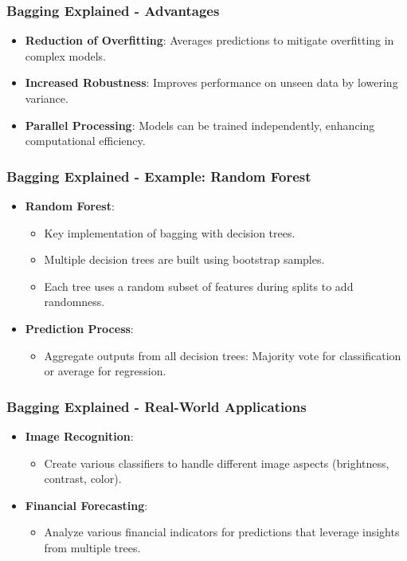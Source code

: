 \documentclass[aspectratio=169]{beamer}
\begin{document}
\begin{frame}[fragile]
    \frametitle{Bagging Explained - Advantages}
    \begin{itemize}
        \item \textbf{Reduction of Overfitting}: Averages predictions to mitigate overfitting in complex models.
        \item \textbf{Increased Robustness}: Improves performance on unseen data by lowering variance.
        \item \textbf{Parallel Processing}: Models can be trained independently, enhancing computational efficiency.
    \end{itemize}
\end{frame}

\begin{frame}[fragile]
    \frametitle{Bagging Explained - Example: Random Forest}
    \begin{itemize}
        \item \textbf{Random Forest}:
            \begin{itemize}
                \item Key implementation of bagging with decision trees.
                \item Multiple decision trees are built using bootstrap samples.
                \item Each tree uses a random subset of features during splits to add randomness.
            \end{itemize}
        
        \item \textbf{Prediction Process}:
            \begin{itemize}
                \item Aggregate outputs from all decision trees: Majority vote for classification or average for regression.
            \end{itemize}
    \end{itemize}
\end{frame}

\begin{frame}[fragile]
    \frametitle{Bagging Explained - Real-World Applications}
    \begin{itemize}
        \item \textbf{Image Recognition}:
            \begin{itemize}
                \item Create various classifiers to handle different image aspects (brightness, contrast, color).
            \end{itemize}
        \item \textbf{Financial Forecasting}:
            \begin{itemize}
                \item Analyze various financial indicators for predictions that leverage insights from multiple trees.
            \end{itemize}
    \end{itemize}
\end{frame}
\end{document}
